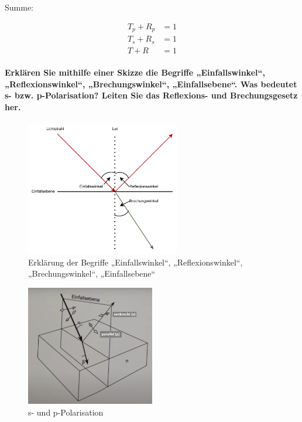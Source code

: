 \documentclass[a4paper, 11pt, ngerman, parskip=half]{scrartcl}
\begin{document}
Summe:

\begin{equation}
    \label{eq:summe_reflexion_transmission}
    \begin{split}
        T_p + R_p &= 1 \\
        T_s + R_s &= 1 \\
        T + R     &= 1
    \end{split}
\end{equation}



\paragraph{Erklären Sie mithilfe einer Skizze die Begriffe „Einfallswinkel“, „Reflexionswinkel“, „Brechungswinkel“, „Einfallsebene“. Was bedeutet s- bzw. p-Polarisation? Leiten Sie das Reflexions-
und Brechungsgesetz her.}
\phantom{}
\begin{figure}[H]
    \centering
    \begin{samepage}
        \includegraphics[width=0.6\textwidth]{image/15/brechung_reflexion2.pdf}
        \caption{Erklärung der Begriffe „Einfallswinkel“, „Reflexionswinkel“, „Brechungswinkel“, „Einfallsebene“}
        \label{fig:reflexion_brechung}
    \end{samepage}
\end{figure}
%
\begin{figure}[!h]
    \centering
    \begin{samepage}
        \includegraphics[width=0.5\textwidth]{image/15/p_s_polarisation.png}
        \caption{s- und p-Polarisation}
        \label{fig:s-p-polarisation}
    \end{samepage}
\end{figure}
\end{document}

